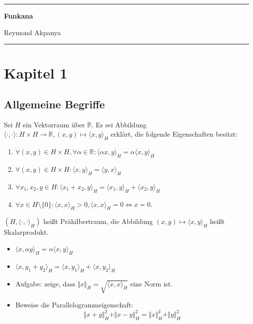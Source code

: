 \documentclass[12pt,titlepage]{article}
\begin{document}
\thispagestyle{empty}
\noindent\rule{\textwidth}{0.5pt}
\centerline{\textbf{\large{Funkana}}}
\centerline{Reymond Akpanya}
\noindent\rule{\textwidth}{0.5pt}
\newline
\section{Kapitel 1}
\subsection{Allgemeine Begriffe}
\begin{definition}[Prähilbertraum]
Sei $H$ ein Vektorraum über $\mathbb{R}$. Es sei Abbildung $\langle \cdot  , \cdot \rangle:H \times H \to \mathbb{R}, (x,y) \mapsto \langle x,y \rangle_H$ erklärt, die folgende Eigenschaften besitzt:
\begin{enumerate}
\item $\forall (x,y) \in H \times H, \forall \alpha \in \mathbb{R}:\langle \alpha x, y \rangle_H = \alpha\langle x, y \rangle_H$ 
\item $\forall (x,y) \in H \times H:\langle x, y \rangle_H=\langle y,x \rangle_H$
\item $\forall x_1,x_2,y \in H:\langle x_1+x_2, y \rangle_H=\langle x_1, y \rangle_H+\langle x_2, y \rangle_H$
\item $\forall x \in H\setminus \{0\}:\langle x, x \rangle_H>0,\langle x, x \rangle_H=0 \Leftrightarrow x=0.$
\end{enumerate}
$(H,\langle \cdot, \cdot \rangle_H)$ heißt Prähilbertraum, die Abbildung $(x,y)\mapsto \langle x, y \rangle_H$ heißt Skalarprodukt. 
\end{definition}
\begin{folgerung}
\begin{itemize}
\item $\langle x,\alpha y \rangle_H=\alpha\langle x, y \rangle_H$
\item $\langle x, y_1+y_2 \rangle_H=\langle x, y_1 \rangle_H+\langle x, y_2 \rangle_H$
\item Aufgabe: zeige, dass $\Vert x \Vert_H=\sqrt{\langle x, x \rangle_H}$ eine Norm ist.
\item Beweise die Parallelogrammeigenschaft:
\[
\Vert x+y \Vert_H^2+\Vert x-y \Vert_H^2=\Vert x \Vert_H^2+\Vert y \Vert_H^2
\]
\end{itemize}
\end{folgerung}
\end{document}
